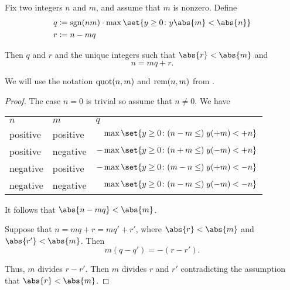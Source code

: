 \begin{algorithm}\label{alg:integer_division}
  Fix two integers \( n \) and \( m \), and assume that \( m \) is nonzero. Define
  \begin{align*}
    q &\coloneqq \sgn(nm) \cdot \max\set{ y \geq 0 \colon y\abs{m} < \abs{n} } \\
    r &\coloneqq n - mq
  \end{align*}

  Then \( q \) and \( r \) and the unique integers such that \( \abs{r} < \abs{m} \) and
  \begin{equation*}
    n = mq + r.
  \end{equation*}

  We will use the notation \( \operatorname{quot}(n, m) \) and \( \operatorname{rem}(n, m) \) from .
\end{algorithm}
\begin{proof}
   The case \( n = 0 \) is trivial so assume that \( n \neq 0 \). We have
  \begin{center}
    \begin{tabular}{l | l | l}
      \( n \)  & \( m \)  & \( q \) \\
      positive & positive & \( \phantom{-}\max\set{ y \geq 0 \colon (n - m \leq) \thickspace y(+m) < +n } \) \\
      positive & negative & \( -\max\set{ y \geq 0 \colon (n + m \leq) \thickspace y(-m) < +n } \) \\
      negative & positive & \( -\max\set{ y \geq 0 \colon (m - n \leq) \thickspace y(+m) < -n } \) \\
      negative & negative & \( \phantom{-}\max\set{ y \geq 0 \colon (n - m \leq) \thickspace y(-m) < -n } \)
    \end{tabular}
  \end{center}

  It follows that \( \abs{n - mq} < \abs{m} \).

  \UniquenessSubProof Suppose that \( n = mq + r = mq' + r' \), where \( \abs{r} < \abs{m} \) and \( \abs{r'} < \abs{m} \). Then
  \begin{equation*}
    m(q - q') = -(r - r').
  \end{equation*}

  Thus, \( m \) divides \( r - r' \). Then \( m \) divides \( r \) and \( r' \) contradicting the assumption that \( \abs{r} < \abs{m} \).
\end{proof}

